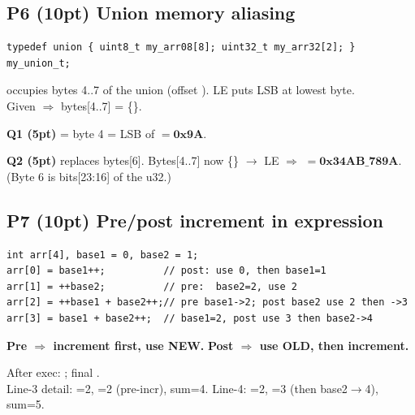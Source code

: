 \subsection{P6 (10pt) Union memory aliasing}
\begin{lstlisting}[language={}]
typedef union { uint8_t my_arr08[8]; uint32_t my_arr32[2]; } my_union_t;
\end{lstlisting}
 occupies bytes 4..7 of the union (offset ). LE puts LSB at lowest byte.\\
Given  $\Rightarrow$ bytes[4..7] = \{\}.
\begin{qp}\textbf{Q1 (5pt)}  = byte 4 = LSB of  $= \mathbf{0x9A}$.\end{qp}
\begin{qp}\textbf{Q2 (5pt)}  replaces bytes[6]. Bytes[4..7] now \{\} $\to$ LE $\Rightarrow$  $= \mathbf{0x34AB\_789A}$. (Byte 6 is bits[23:16] of the u32.)\end{qp}

\subsection{P7 (10pt) Pre/post increment in expression}
\begin{lstlisting}[language={}]
int arr[4], base1 = 0, base2 = 1;
arr[0] = base1++;          // post: use 0, then base1=1
arr[1] = ++base2;          // pre:  base2=2, use 2
arr[2] = ++base1 + base2++;// pre base1->2; post base2 use 2 then ->3
arr[3] = base1 + base2++;  // base1=2, post use 3 then base2->4
\end{lstlisting}
\textbf{Pre $\Rightarrow$ increment first, use NEW.} \textbf{Post $\Rightarrow$ use OLD, then increment.}
\begin{qp}
After exec: ; final .\\
Line-3 detail: =2, =2 (pre-incr), sum=4. Line-4: =2, =3 (then base2$\to$4), sum=5.
\end{qp}

